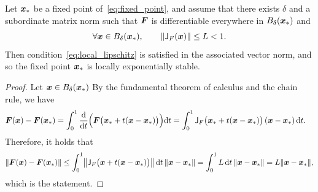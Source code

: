 \begin{proposition}
    \label{proposition:local_convergence_fixed_point}
    Let $\mathbf{\boldsymbol{x}}_*$ be a fixed point of~\eqref{eq:fixed_point},
    and assume that there exists $\delta$ and a subordinate matrix norm such that
    $\mathbf{\boldsymbol{F}}$ is differentiable everywhere in $B_{\delta}(\mathbf{\boldsymbol{x}}_*)$ and
    \[
        \forall \mathbf{\boldsymbol{x}} \in B_{\delta}(\mathbf{\boldsymbol{x}}_*), \qquad
        \lVert\mathsf J_F(\mathbf{\boldsymbol{x}})\rVert \leq L < 1.
    \]
    Then condition~\eqref{eq:local_lipschitz} is satisfied in the associated vector norm,
    and so the fixed point $\mathbf{\boldsymbol{x}}_*$ is locally exponentially stable.
\end{proposition}
\begin{proof}
    Let $\mathbf{\boldsymbol{x}} \in B_{\delta}(\mathbf{\boldsymbol{x}}_*)$
    By the fundamental theorem of calculus and the chain rule,
    we have
    \begin{align*}
        \mathbf{\boldsymbol{F}}(\mathbf{\boldsymbol{x}}) - \mathbf{\boldsymbol{F}}(\mathbf{\boldsymbol{x}}_*)
        &= \int_{0}^{1} \frac{\mathrm d}{\mathrm d t} \Bigl( \mathbf{\boldsymbol{F}}\bigl(\mathbf{\boldsymbol{x}}_* + t(\mathbf{\boldsymbol{x}} - \mathbf{\boldsymbol{x}}_*) \bigr) \Bigr) \mathrm d t
        = \int_{0}^{1} \mathsf J_F\bigl(\mathbf{\boldsymbol{x}}_* + t(\mathbf{\boldsymbol{x}} - \mathbf{\boldsymbol{x}}_*)\bigr) \left(\mathbf{\boldsymbol{x}} - \mathbf{\boldsymbol{x}}_* \right) \mathrm d t.
    \end{align*}
    Therefore,
    it holds that
    \begin{align*}
        \norm{\vect F(\vect x) - \vect F(\vect x_*)}
        \leq \int_{0}^{1} \norm*{\mat J_F\bigl(\vect x + t(\vect x - \vect x_*)\bigr)}  \, \d t \, \norm{\vect x - \vect x_*}
        = \int_{0}^{1} L \, \d t \, \norm{\vect x - \vect x_*} = L \norm{\vect x - \vect x_*},
    \end{align*}
    which is the statement.
\end{proof}

